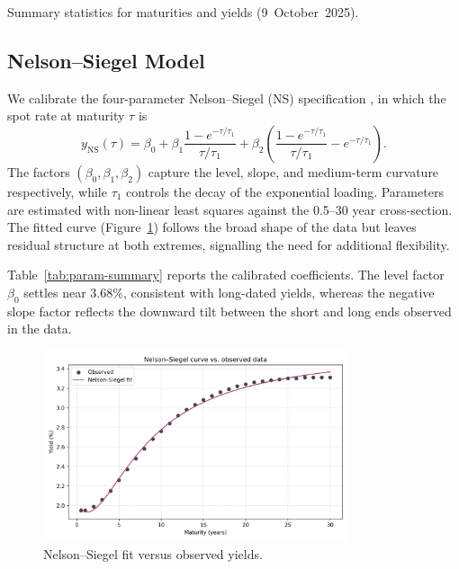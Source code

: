 \documentclass[12pt]{article}
\begin{document}
\begin{table}[htbp]
  \centering
  \caption{Summary statistics for maturities and yields (9~October~2025).}
  \label{tab:summary-stats}
  
\end{table}

\subsection{Nelson--Siegel Model}
\begin{spacing}{1.15}
We calibrate the four-parameter Nelson--Siegel (NS) specification \parencite{nelson_siegel_1987}, in which the spot rate at maturity $\tau$ is
\begin{equation}
  y_{\text{NS}}(\tau) = \beta_0 + \beta_1 \frac{1 - e^{-\tau/\tau_1}}{\tau/\tau_1} + \beta_2 \left( \frac{1 - e^{-\tau/\tau_1}}{\tau/\tau_1} - e^{-\tau/\tau_1} \right).
\end{equation}
The factors $(\beta_0, \beta_1, \beta_2)$ capture the level, slope, and medium-term curvature respectively, while $\tau_1$ controls the decay of the exponential loading. Parameters are estimated with non-linear least squares against the 0.5--30 year cross-section. The fitted curve (Figure~\ref{fig:ns-fit}) follows the broad shape of the data but leaves residual structure at both extremes, signalling the need for additional flexibility.

Table~\ref{tab:param-summary} reports the calibrated coefficients. The level factor $\beta_0$ settles near 3.68\%, consistent with long-dated yields, whereas the negative slope factor reflects the downward tilt between the short and long ends observed in the data.
\end{spacing}

\begin{figure}[htbp]
  \centering
  \includegraphics[width=0.8\textwidth]{../data/output/figure_ns_fit.png}
  \caption{Nelson--Siegel fit versus observed yields.}
  \label{fig:ns-fit}
\end{figure}
\end{document}
